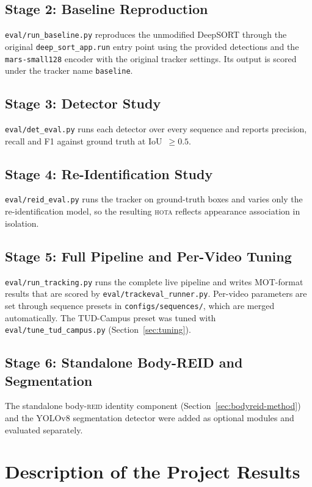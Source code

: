 \documentclass[12pt, a4paper]{article}
\newcommand{\hota}{\textsc{hota}}
\newcommand{\reid}{\textsc{reid}}
\begin{document}
\subsection{Stage 2: Baseline Reproduction}
\texttt{eval/run\_baseline.py} reproduces the unmodified DeepSORT through the original
\texttt{deep\_sort\_app.run} entry point using the provided detections and the
\texttt{mars-small128} encoder with the original tracker settings. Its output is scored under the
tracker name \texttt{baseline}.

\subsection{Stage 3: Detector Study}
\texttt{eval/det\_eval.py} runs each detector over every sequence and reports precision, recall and
F1 against ground truth at IoU~$\geq 0.5$.

\subsection{Stage 4: Re-Identification Study}
\texttt{eval/reid\_eval.py} runs the tracker on ground-truth boxes and varies only the
re-identification model, so the resulting \hota{} reflects appearance association in isolation.

\subsection{Stage 5: Full Pipeline and Per-Video Tuning}
\texttt{eval/run\_tracking.py} runs the complete live pipeline and writes MOT-format results that are
scored by \texttt{eval/trackeval\_runner.py}. Per-video parameters are set through sequence presets
in \texttt{configs/sequences/}, which are merged automatically. The TUD-Campus preset was tuned with
\texttt{eval/tune\_tud\_campus.py} (Section~\ref{sec:tuning}).

\subsection{Stage 6: Standalone Body-REID and Segmentation}
The standalone body-\reid{} identity component (Section~\ref{sec:bodyreid-method}) and the YOLOv8
segmentation detector were added as optional modules and evaluated separately.

\section{Description of the Project Results}
\label{sec:results}
\end{document}
